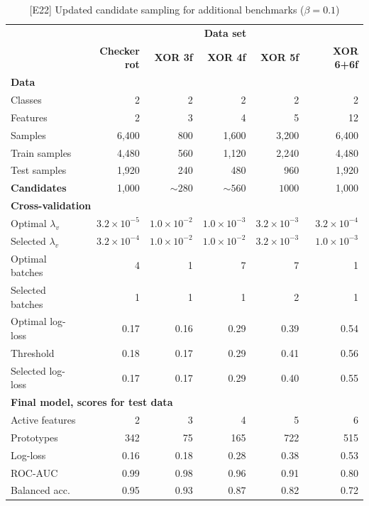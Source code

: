 \begin{table}
\caption{[E22] Updated candidate sampling for additional benchmarks ($\beta=0.1$)}
\label{tab_e22}
%
\begin{center}
\small
\begin{tabular}{|lrrrrr|}
\hline
&\multicolumn{5}{c|}{\textbf{\hrulefill\ Data set \hrulefill}}\\
&\textbf{Checker rot}&\textbf{XOR 3f}&\textbf{XOR 4f}&\textbf{XOR 5f}&\textbf{XOR 6+6f}\\
\multicolumn{6}{|l|}{\textbf{Data}}\\
Classes&2&2&2&2&2\\
Features&2&3&4&5&12\\
Samples&6,400&800&1,600&3,200&6,400\\
Train samples&4,480&560&1,120&2,240&4,480\\
Test samples&1,920&240&480&960&1,920\\
\textbf{Candidates}&1,000&$\sim280$&$\sim560$&$1000$&1,000\\
\multicolumn{6}{|l|}{\textbf{Cross-validation}}\\
Optimal $\lambda_v$&$3.2\times10^{-5}$&$1.0\times10^{-2}$&$1.0\times10^{-3}$&$3.2\times10^{-3}$&$3.2\times10^{-4}$\\
Selected $\lambda_v$&$3.2\times10^{-4}$&$1.0\times10^{-2}$&$1.0\times10^{-2}$&$3.2\times10^{-3}$&$1.0\times10^{-3}$\\
Optimal batches&4&1&7&7&1\\
Selected batches&1&1&1&2&1\\
Optimal log-loss&0.17&0.16&0.29&0.39&0.54\\
Threshold&0.18&0.17&0.29&0.41&0.56\\
Selected log-loss&0.17&0.17&0.29&0.40&0.55\\
\multicolumn{6}{|l|}{\textbf{Final model, scores for test data}}\\
Active features&2&3&4&5&6\\
Prototypes&342&75&165&722&515\\
Log-loss&0.16&0.18&0.28&0.38&0.53\\
ROC-AUC&0.99&0.98&0.96&0.91&0.80\\
Balanced acc.&0.95&0.93&0.87&0.82&0.72\\
\hline
\end{tabular}
\end{center}
\end{table}
%
